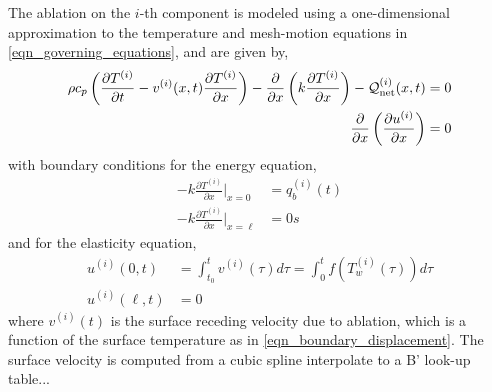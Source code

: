 The ablation on the $i$-th component is modeled using a one-dimensional approximation to the temperature and mesh-motion equations in \cref{eqn_governing_equations}, and are given by,
\begin{subequations}
    \begin{align}
        \rho c_p\left(\frac{\partial T^{(i)}}{\partial t} - v^{(i)}(x,t)\frac{\partial T^{(i)}}{\partial x}\right) - \frac{\partial}{\partial x}\left(k\frac{\partial T^{(i)}}{\partial x}\right) - \mathcal{Q}^{(i)}_{\text{net}}(x,t) &= 0\label{eqn_thermal_1d}\\
        \frac{\partial}{\partial x}\left(\frac{\partial u^{(i)}}{\partial x}\right) &= 0\label{eqn_elasticity_1d}
    \end{align}\label{eqn_rpm}
\end{subequations}
with boundary conditions for the energy equation,
\begin{subequations}
    \begin{align}
        -k\frac{\partial T^{(i)}}{\partial x}\Bigg|_{x=0} &= q^{(i)}_b(t)\\
        -k\frac{\partial T^{(i)}}{\partial x}\Bigg|_{x=\ell} &= 0s
    \end{align}
\end{subequations}
and for the elasticity equation,
\begin{subequations}
    \begin{align}
        u^{(i)}(0,t) &= \int_{t_0}^{t}v^{(i)}(\tau)d\tau = \int_{0}^{t} f(T^{(i)}_w(\tau))d\tau\\
        u^{(i)}(\ell,t) &= 0
    \end{align}
\end{subequations}
where $v^{(i)}(t)$ is the surface receding velocity due to ablation, which is a function of the surface temperature as in \cref{eqn_boundary_displacement}. The surface velocity is computed from a cubic spline interpolate to a B' look-up table...

